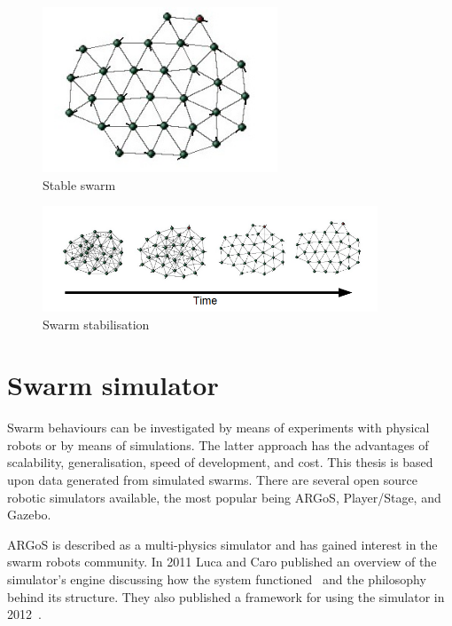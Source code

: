 \begin{figure}[H]
\begin{center}
\includegraphics[width=7cm]{CHAPTER-2/figures/Stable}
\end{center}
\caption{Stable swarm\label{methods:Stable1}}
\end{figure}

\begin{figure}[H]
\begin{center}
\includegraphics[width=10cm]{CHAPTER-2/figures/StableTime}
\end{center}
\caption{Swarm stabilisation\label{methods:StableTime1}}
\end{figure}

\section{Swarm simulator}\label{chapter:simulator}
Swarm behaviours can be investigated by means of experiments with physical robots or by means of simulations. The latter approach has the advantages of scalability, generalisation, speed of development, and cost. This thesis is based upon data generated from simulated swarms. There are several open source robotic simulators available, the most popular being ARGoS, Player/Stage, and Gazebo.

ARGoS is described as a multi-physics simulator and has gained interest in the swarm robots community. In 2011 Luca and Caro published an overview of the simulator's engine discussing how the system functioned~\cite{PTOPB:11} and the philosophy behind its structure. They also published a framework for using the simulator in 2012~\cite{KCGD:12}. 


